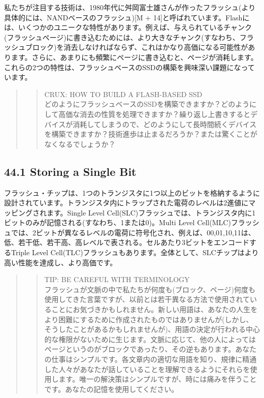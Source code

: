 私たちが注目する技術は、1980年代に舛岡富士雄さんが作ったフラッシュ(より具体的には、NANDベースのフラッシュ){[}M
+
14{]}と呼ばれています。Flashには、いくつかのユニークな特性があります。例えば、与えられているチャンク(フラッシュページ)に書き込むためには、より大きなチャンク(すなわち、フラッシュブロック)を消去しなければならず、これはかなり高価になる可能性があります。さらに、あまりにも頻繁にページに書き込むと、ページが消耗します。これらの2つの特性は、フラッシュベースのSSDの構築を興味深い課題になっています。

\begin{quote}
\begin{quote}
CRUX: HOW TO BUILD A FLASH-BASED SSD\\
どのようにフラッシュベースのSSDを構築できますか？どのようにして高価な消去の性質を処理できますか？繰り返し上書きするとデバイスが消耗してしまうので、どのようにして長時間続くデバイスを構築できますか？技術進歩は止まるだろうか？または驚くことがなくなるでしょうか？
\end{quote}
\end{quote}

\hypertarget{storing-a-single-bit}{%
\subsection*{44.1 Storing a Single Bit}\label{storing-a-single-bit}}

フラッシュ・チップは、1つのトランジスタに1つ以上のビットを格納するように設計されています。トランジスタ内にトラップされた電荷のレベルは2進値にマッピングされます。Single
Level
Cell(SLC)フラッシュでは、トランジスタ内に1ビットのみが記憶される(すなわち、1または0)。Multi
Level
Cell(MLC)フラッシュでは、2ビットが異なるレベルの電荷に符号化され、例えば、00,01,10,11は、低、若干低、若干高、高レベルで表される。セルあたり3ビットをエンコードするTriple
Level
Cell(TLC)フラッシュもあります。全体として、SLCチップはより高い性能を達成し、より高価です。

\begin{quote}
\begin{quote}
TIP: BE CAREFUL WITH TERMINOLOGY\\
フラッシュが文脈の中で私たちが何度も(ブロック、ページ)何度も使用してきた言葉ですが、以前とは若干異なる方法で使用されていることにお気づきかもしれません。新しい用語は、あなたの人生をより困難にするために作成されたものではありませんが(しかし、そうしたことがあるかもしれませんが)、用語の決定が行われる中心的な権限がないために生じます。文脈に応じて、他の人によってはページというのがブロックであったり、その逆もあります。あなたの仕事はシンプルです。各文章内の適切な用語を知り、規律に精通した人々があなたが話していることを理解できるようにそれらを使用します。唯一の解決策はシンプルですが、時には痛みを伴うことです。あなたの記憶を使用してください。
\end{quote}
\end{quote}

